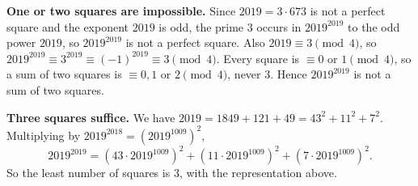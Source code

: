 \textbf{One or two squares are impossible.} Since $2019=3\cdot673$ is not a perfect square and the exponent $2019$ is odd, the prime $3$ occurs in $2019^{2019}$ to the odd power $2019$, so $2019^{2019}$ is not a perfect square. Also $2019\equiv3\pmod4$, so $2019^{2019}\equiv3^{2019}\equiv(-1)^{2019}\equiv3\pmod4$. Every square is $\equiv0$ or $1\pmod4$, so a sum of two squares is $\equiv0,1$ or $2\pmod4$, never $3$. Hence $2019^{2019}$ is not a sum of two squares.

\textbf{Three squares suffice.} We have $2019=1849+121+49=43^2+11^2+7^2$. Multiplying by $2019^{2018}=\left(2019^{1009}\right)^2$,
\[
2019^{2019}=\left(43\cdot2019^{1009}\right)^2+\left(11\cdot2019^{1009}\right)^2+\left(7\cdot2019^{1009}\right)^2 .
\]
So the least number of squares is $\boxed{3}$, with the representation above.
